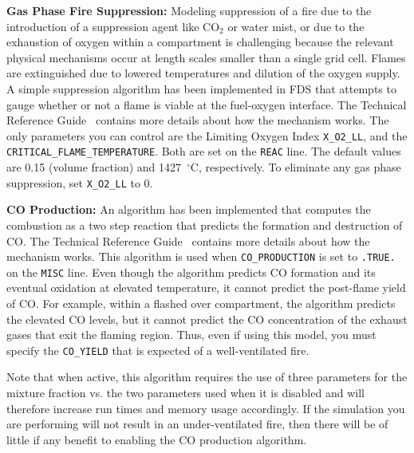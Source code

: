 \documentclass[11pt]{book}
\newcommand{\ct}{\tt\small}
\begin{document}
\vspace{\baselineskip}
\noindent
{\bf Gas Phase Fire Suppression:}
Modeling suppression of a fire due to the introduction of a suppression
agent like CO$_2$ or water mist, or due to the exhaustion of oxygen
within a compartment is challenging because
the relevant physical mechanisms occur at length scales smaller than a
single grid cell. Flames are extinguished due to lowered
temperatures and dilution of the oxygen supply. A simple
suppression algorithm has been implemented in FDS that attempts to
gauge whether or not a flame is viable at the fuel-oxygen interface. The Technical Reference Guide~\cite{FDS_Tech_Guide_5}
contains more details about how the mechanism works. The only
parameters you can control are the Limiting
Oxygen Index {\ct X\_O2\_LL},
and the {\ct CRITICAL\_FLAME\_TEMPERATURE}. Both are
set on the {\ct REAC} line.
The default values are 0.15 (volume fraction) and 1427~$^\circ$C, respectively.
To eliminate any gas phase suppression, set {\ct X\_O2\_LL} to 0.

\vspace{\baselineskip}
\noindent
{\bf CO Production:}
An algorithm has been implemented that computes the combustion as a two step reaction that
predicts the formation and destruction of CO.  The Technical Reference Guide~\cite{FDS_Tech_Guide_5}
contains more details about how the mechanism works. This algorithm is used when
{\ct CO\_PRODUCTION} is set to {\ct .TRUE.} on the {\ct MISC} line. Even though the algorithm predicts
CO formation and its eventual oxidation at elevated temperature, it cannot predict the post-flame
yield of CO. For example, within a flashed over compartment, the algorithm predicts the elevated
CO levels, but it cannot predict the CO concentration of the exhaust gases that exit the flaming region.
Thus, even if using this model, you must specify the {\ct CO\_YIELD} that is expected of a well-ventilated fire.

\begin{warning}
\noindent
Note that when active, this algorithm requires the use of three parameters
for the mixture fraction vs. the two parameters used when it is disabled and will therefore
increase run times and memory usage accordingly.  If the simulation you are
performing will not result in an under-ventilated fire, then there will be of
little if any benefit to enabling the CO production algorithm.
\end{warning}



\clearpage
\end{document}
